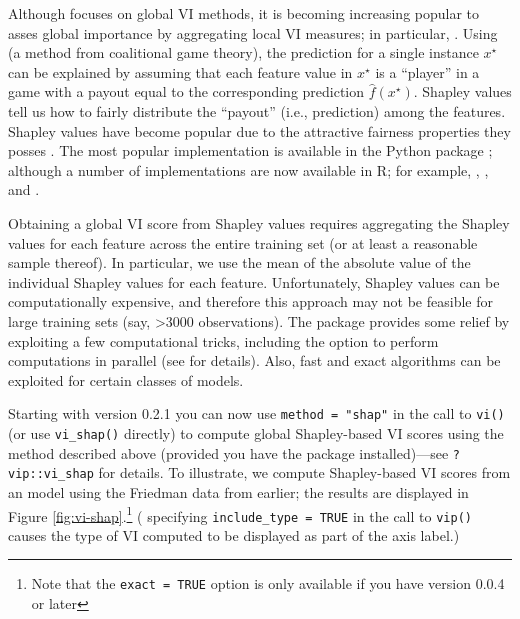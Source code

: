 Although  focuses on global VI methods, it is becoming
increasing popular to asses global importance by aggregating local VI
measures; in particular, 
\citep{strumbelj-2014-explaining}. Using  (a method
from coalitional game theory), the prediction for a single instance
\(x^\star\) can be explained by assuming that each feature value in
\(x^\star\) is a ``player'' in a game with a payout equal to the
corresponding prediction \(\widehat{f}\left(x^\star\right)\). Shapley
values tell us how to fairly distribute the ``payout'' (i.e.,
prediction) among the features. Shapley values have become popular due
to the attractive fairness properties they posses
\citep{lundberg_unified_2017}. The most popular implementation is
available in the Python  package
\citep{lundberg_unified_2017}; although a number of implementations are
now available in R; for example, , 
\citep{R-iBreakDown}, and  \citep{R-fastshap}.

Obtaining a global VI score from Shapley values requires aggregating the
Shapley values for each feature across the entire training set (or at
least a reasonable sample thereof). In particular, we use the mean of
the absolute value of the individual Shapley values for each feature.
Unfortunately, Shapley values can be computationally expensive, and
therefore this approach may not be feasible for large training sets
(say, \textgreater{}3000 observations). The  package
provides some relief by exploiting a few computational tricks, including
the option to perform computations in parallel (see
 for details). Also, fast and exact algorithms
\citep{lundberg-explainable-2019} can be exploited for certain classes
of models.

Starting with  version 0.2.1 you can now use
\texttt{method\ =\ "shap"} in the call to \texttt{vi()} (or use
\texttt{vi\_shap()} directly) to compute global Shapley-based VI scores
using the method described above (provided you have the 
package installed)---see \texttt{?vip::vi\_shap} for details. To
illustrate, we compute Shapley-based VI scores from an 
model \citep{R-xgboost} using the Friedman data from earlier; the
results are displayed in Figure \ref{fig:vi-shap}.\footnote{Note that
  the \texttt{exact\ =\ TRUE} option is only available if you have
   version 0.0.4 or later} ( specifying
\texttt{include\_type\ =\ TRUE} in the call to \texttt{vip()} causes the
type of VI computed to be displayed as part of the axis label.)


